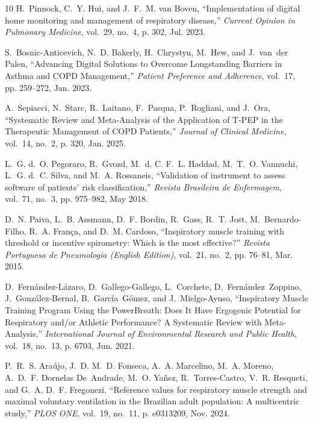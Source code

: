\documentclass{ieeeaccess}
\begin{document}
{\begin{thebibliography}{10}
H.~Pinnock, C.~Y. Hui, and J.~F.~M. {van Boven}, ``Implementation of digital home monitoring and management of respiratory disease,'' \emph{Current Opinion in Pulmonary Medicine}, vol.~29, no.~4, p. 302, Jul. 2023.

S.~{Bosnic-Anticevich}, N.~D. Bakerly, H.~Chrystyn, M.~Hew, and J.~van~der Palen, ``Advancing {{Digital Solutions}} to {{Overcome Longstanding Barriers}} in {{Asthma}} and {{COPD Management}},'' \emph{Patient Preference and Adherence}, vol.~17, pp. 259--272, Jan. 2023.

A.~Sepiacci, N.~Starc, R.~Laitano, F.~Pasqua, P.~Rogliani, and J.~Ora, ``Systematic {{Review}} and {{Meta-Analysis}} of the {{Application}} of {{T-PEP}} in the {{Therapeutic Management}} of {{COPD Patients}},'' \emph{Journal of Clinical Medicine}, vol.~14, no.~2, p. 320, Jan. 2025.

L.~G. d.~O. Pegoraro, R.~Gvozd, M.~d. C. F.~L. Haddad, M.~T.~O. Vannuchi, L.~G. d.~C. Silva, and M.~A. Rossaneis, ``Validation of instrument to assess software of patients' risk classification,'' \emph{Revista Brasileira de Enfermagem}, vol.~71, no.~3, pp. 975--982, May 2018.

D.~N. Paiva, L.~B. Assmann, D.~F. Bordin, R.~Gass, R.~T. Jost, M.~{Bernardo-Filho}, R.~A. Fran{\c c}a, and D.~M. Cardoso, ``Inspiratory muscle training with threshold or incentive spirometry: {{Which}} is the most effective?'' \emph{Revista Portuguesa de Pneumologia (English Edition)}, vol.~21, no.~2, pp. 76--81, Mar. 2015.

D.~{Fern{\'a}ndez-L{\'a}zaro}, D.~{Gallego-Gallego}, L.~Corchete, D.~Fern{\'a}ndez~Zoppino, J.~{Gonz{\'a}lez-Bernal}, B.~Garc{\'i}a~G{\'o}mez, and J.~{Mielgo-Ayuso}, ``Inspiratory {{Muscle Training Program Using}} the {{PowerBreath}}\textregistered : {{Does It Have Ergogenic Potential}} for {{Respiratory}} and/or {{Athletic Performance}}? {{A Systematic Review}} with {{Meta-Analysis}},'' \emph{International Journal of Environmental Research and Public Health}, vol.~18, no.~13, p. 6703, Jun. 2021.

P.~R.~S. Ara{\'u}jo, J.~D. M.~D. Fonseca, A.~A. Marcelino, M.~A. Moreno, A.~D.~F. Dornelas De~Andrade, M.~O. Ya{\~n}ez, R.~{Torres-Castro}, V.~R. Resqueti, and G.~A. D.~F. Fregonezi, ``Reference values for respiratory muscle strength and maximal voluntary ventilation in the {{Brazilian}} adult population: {{A}} multicentric study,'' \emph{PLOS ONE}, vol.~19, no.~11, p. e0313209, Nov. 2024.


\end{thebibliography}}
\end{document}
